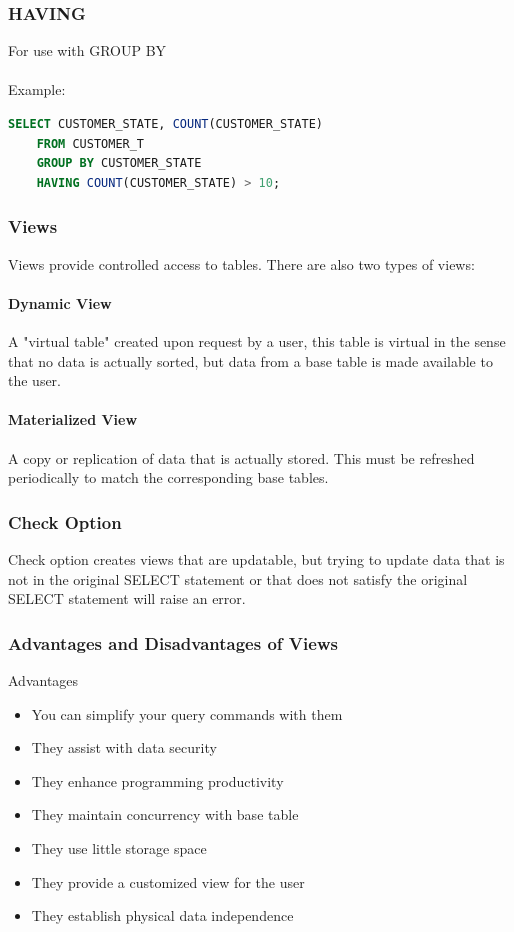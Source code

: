 \documentclass[12pt]{article}
\begin{document}
\subsubsection{HAVING}

For use with GROUP BY\\
\\
Example:\\

\begin{lstlisting}[language=SQL]
SELECT CUSTOMER_STATE, COUNT(CUSTOMER_STATE) 
	FROM CUSTOMER_T
	GROUP BY CUSTOMER_STATE
	HAVING COUNT(CUSTOMER_STATE) > 10;

\end{lstlisting}

\subsubsection{Views}
Views provide controlled access to tables. There are also two types of views:
\paragraph{Dynamic View} A "virtual table" created upon request by a user, this table is virtual in the sense that no data is actually sorted, but data from a base table is made available to the user.

\paragraph{Materialized View} A copy or replication of data that is actually stored. This must be refreshed periodically to match the corresponding base tables.

\subsubsection{Check Option}

Check option creates views that are updatable, but trying to update data that is not in the original SELECT statement or that does not satisfy the original SELECT statement will raise an error.

\subsubsection{Advantages and Disadvantages of Views}

Advantages
\begin{itemize}
	\item{You can simplify your query commands with them}
	\item{They assist with data security}
	\item{They enhance programming productivity}
	\item{They maintain concurrency with base table}
	\item{They use little storage space}
	\item{They provide a customized view for the user}
	\item{They establish physical data independence}
\end{itemize}
\end{document}
